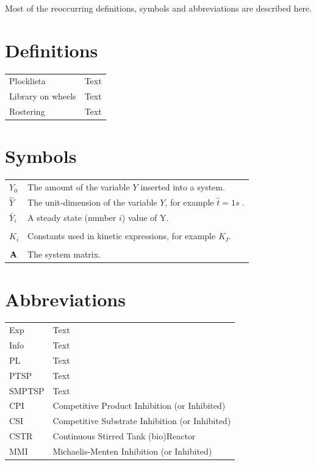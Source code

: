 \documentclass[a4paper, 10pt, twoside, openright]{book}
\begin{document}
Most of the reoccurring definitions, symbols and abbreviations are described here.

\section*{Definitions}
\begin{tabular}{ll}
Plocklista & Text\\
Library on wheels & Text\\
Rostering & Text\\
\end{tabular}

\section*{Symbols}

\begin{tabular}{ll}
$Y_0$      & The amount of the variable $Y$ inserted into a system.\\
$\hat Y$& The unit-dimension of the variable $Y$, for example $\hat t=1s$ .\\
$\bar Y_i$ & A steady state (number $i$) value of Y.\\
\phantom{a}& \phantom{b} \\
$K_i$ & Constants used in kinetic expressions, for example $K_I$.\\
\phantom{a}& \phantom{b} \\
$\mathbf{A}$     & The system matrix. \\
\end{tabular}

\section*{Abbreviations}

\begin{tabular}{ll}
Exp		& Text\\
Info	& Text\\
PL		& Text\\
PTSP	& Text\\
SMPTSP	& Text\\




CPI      & Competitive Product Inhibition (or Inhibited)\index{CPI}\\
CSI      & Competitive Substrate Inhibition (or Inhibited)\index{CSI}\\
CSTR     & Continuous Stirred Tank (bio)Reactor\index{CSTR}\\
MMI      & Michaelis-Menten Inhibition (or Inhibited)\index{MMI}
\end{tabular}
\end{document}
